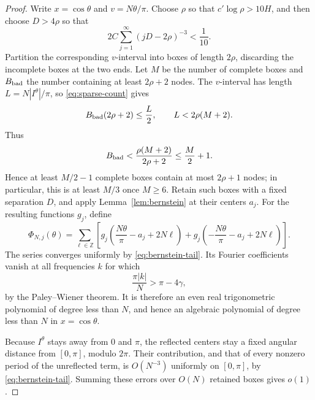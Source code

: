 \documentclass[11pt]{article}
\theoremstyle{definition}
\numberwithin{equation}{section}
\newcommand{\Z}{\mathbb Z}
\begin{document}
\begin{proof}
Write \(x=\cos\theta\) and \(v=N\theta/\pi\).
Choose \(\rho\) so that \(c'\log\rho>10H\), and then choose
\(D>4\rho\) so that
\begin{equation}\label{eq:sparse-tail-choice}
 2C\sum_{j=1}^{\infty}(jD-2\rho)^{-3}<\frac1{10}.
\end{equation}
Partition the corresponding \(v\)-interval into boxes of length
\(2\rho\), discarding the incomplete boxes at the two ends. Let \(M\)
be the number of complete boxes and \(B_{\rm bad}\) the number
containing at least \(2\rho+2\) nodes. The \(v\)-interval has length
\(L=N|I^\theta|/\pi\), so \eqref{eq:sparse-count} gives
\[
 B_{\rm bad}(2\rho+2)\le \frac L2,
 \qquad L<2\rho(M+2).
\]
Thus
\[
 B_{\rm bad}<\frac{\rho(M+2)}{2\rho+2}\le\frac M2+1.
\]
Hence at least \(M/2-1\) complete boxes contain at most \(2\rho+1\)
nodes; in particular, this is at least \(M/3\) once \(M\ge6\). Retain such boxes with a fixed separation \(D\),
and apply Lemma~\ref{lem:bernstein} at their centers \(a_j\).
For the resulting functions \(g_j\), define
\begin{equation}\label{eq:periodization}
 \Phi_{N,j}(\theta)=
 \sum_{\ell\in\Z}
 \left[
 g_j\left(\frac{N\theta}{\pi}-a_j+2N\ell\right)
 +g_j\left(-\frac{N\theta}{\pi}-a_j+2N\ell\right)
 \right].
\end{equation}
The series converges uniformly by \eqref{eq:bernstein-tail}.
Its Fourier coefficients vanish at all frequencies \(k\) for which
\[
 \frac{\pi|k|}{N}>\pi-4\gamma,
\]
by the Paley--Wiener theorem. It is therefore an even real
trigonometric polynomial of degree less than \(N\), and hence an
algebraic polynomial of degree less than \(N\) in \(x=\cos\theta\).

Because \(I^\theta\) stays away from \(0\) and \(\pi\), the reflected
centers stay a fixed angular distance from \([0,\pi]\), modulo
\(2\pi\). Their contribution, and that of every nonzero period of
the unreflected term, is \(O(N^{-3})\) uniformly on \([0,\pi]\), by
\eqref{eq:bernstein-tail}. Summing these errors over \(O(N)\)
retained boxes gives \(o(1)\).


\end{proof}
\end{document}
